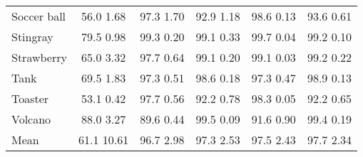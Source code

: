 \documentclass[10pt]{article} \usepackage[accepted]{stylefiles/tmlr}
\begin{document}
\begin{table*}[th]
\begin{tabular}{lccccc}
Soccer ball & \multicolumn{1}{c|}{56.0  1.68} & 97.3  1.70 & \multicolumn{1}{c|}{92.9  1.18} & 98.6  0.13 & \multicolumn{1}{c}{93.6  0.61} \\
Stingray & \multicolumn{1}{c|}{79.5  0.98} & 99.3  0.20 & \multicolumn{1}{c|}{99.1  0.33} & 99.7  0.04 & \multicolumn{1}{c}{99.2  0.10} \\
Strawberry & \multicolumn{1}{c|}{65.0  3.32} & 97.7  0.64 & \multicolumn{1}{c|}{99.1  0.20} & 99.1  0.03 & \multicolumn{1}{c}{99.2  0.22} \\
Tank & \multicolumn{1}{c|}{69.5  1.83} & 97.3  0.51 & \multicolumn{1}{c|}{98.6  0.18} & 97.3  0.47 & \multicolumn{1}{c}{98.9  0.13} \\
Toaster & \multicolumn{1}{c|}{53.1  0.42} & 97.7  0.56 & \multicolumn{1}{c|}{92.2  0.78} & 98.3  0.05 & \multicolumn{1}{c}{92.2  0.65} \\
Volcano & \multicolumn{1}{c|}{88.0  3.27} & 89.6  0.44 & \multicolumn{1}{c|}{99.5  0.09} & 91.6  0.90 & \multicolumn{1}{c}{99.4  0.19} \\
\midrule
Mean & \multicolumn{1}{c|}{61.1  10.61} & 96.7  2.98 & \multicolumn{1}{c|}{97.3  2.53} & 97.5  2.43 & \multicolumn{1}{c}{97.7  2.34} \\
\bottomrule
\end{tabular}
     \end{table*}
\end{document}
